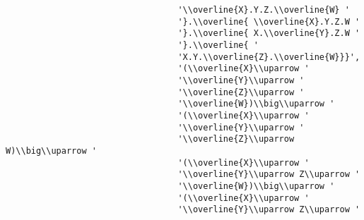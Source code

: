 \begin{verbatim}
                                  '\\overline{X}.Y.Z.\\overline{W} '
                                  '}.\\overline{ \\overline{X}.Y.Z.W '
                                  '}.\\overline{ X.\\overline{Y}.Z.W '
                                  '}.\\overline{ '
                                  'X.Y.\\overline{Z}.\\overline{W}}}',
                                  '(\\overline{X}\\uparrow '
                                  '\\overline{Y}\\uparrow '
                                  '\\overline{Z}\\uparrow '
                                  '\\overline{W})\\big\\uparrow '
                                  '(\\overline{X}\\uparrow '
                                  '\\overline{Y}\\uparrow '
                                  '\\overline{Z}\\uparrow W)\\big\\uparrow '
                                  '(\\overline{X}\\uparrow '
                                  '\\overline{Y}\\uparrow Z\\uparrow '
                                  '\\overline{W})\\big\\uparrow '
                                  '(\\overline{X}\\uparrow '
                                  '\\overline{Y}\\uparrow Z\\uparrow '

\end{verbatim}

